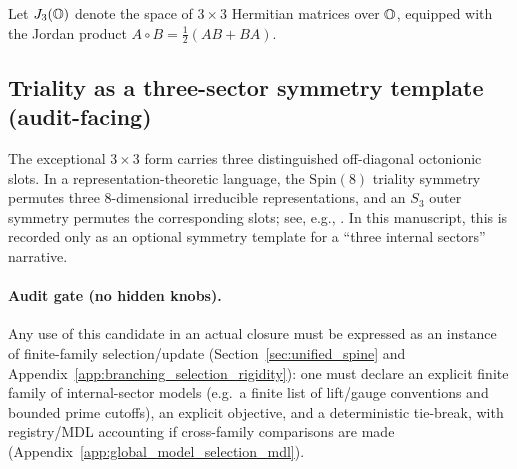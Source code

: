 \begin{definition}\label{def:albert_candidate}
\MathTag Let $J_3(\mathbb{O})$ denote the space of $3\times 3$ Hermitian matrices over $\mathbb{O}$, equipped with the Jordan product $A\circ B=\tfrac12(AB+BA)$.
\end{definition}

\subsection{Triality as a three-sector symmetry template (audit-facing)}
\label{subsec:triality_candidate}

\AuditTag The exceptional $3\times 3$ form carries three distinguished off-diagonal octonionic slots.
In a representation-theoretic language, the $\mathrm{Spin}(8)$ triality symmetry permutes three $8$-dimensional irreducible representations, and an $S_3$ outer symmetry permutes the corresponding slots; see, e.g., \cite{Baez2002,GunaydinGursey1973}.
In this manuscript, this is recorded only as an optional symmetry template for a ``three internal sectors'' narrative.

\paragraph{Audit gate (no hidden knobs).}
\AuditTag Any use of this candidate in an actual closure must be expressed as an instance of finite-family selection/update (Section~\ref{sec:unified_spine} and Appendix~\ref{app:branching_selection_rigidity}):
one must declare an explicit finite family of internal-sector models (e.g.\ a finite list of lift/gauge conventions and bounded prime cutoffs), an explicit objective, and a deterministic tie-break, with registry/MDL accounting if cross-family comparisons are made (Appendix~\ref{app:global_model_selection_mdl}).

